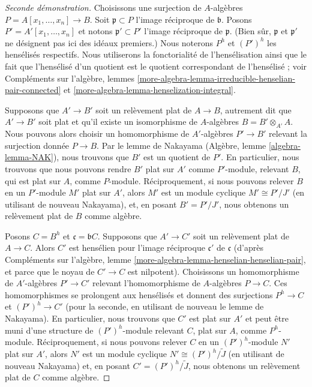 \begin{proof}[Seconde démonstration]
Choisissons une surjection de $A$-algèbres $P = A[x_1, \ldots, x_n] \to B$.
Soit $\mathfrak p \subset P$ l'image réciproque de $\mathfrak b$.
Posons $P' = A'[x_1, \ldots, x_n]$ et notons $\mathfrak p' \subset P'$
l'image réciproque de $\mathfrak p$. (Bien sûr, $\mathfrak p$
et $\mathfrak p'$ ne désignent pas ici des idéaux premiers.)
Nous noterons $P^h$ et $(P')^h$ les hensélisés respectifs.
Nous utiliserons la fonctorialité de l'hensélisation ainsi que le fait que
l'hensélisé d'un quotient est le quotient correspondant
de l'hensélisé ; voir
Compléments sur l'algèbre, lemmes
\ref{more-algebra-lemma-irreducible-henselian-pair-connected} et
\ref{more-algebra-lemma-henselization-integral}.

\medskip\noindent
Supposons que $A' \to B'$ soit un relèvement plat de $A \to B$, autrement dit
que $A' \to B'$ soit plat et qu'il existe un isomorphisme de $A$-algèbres
$B = B' \otimes_{A'} A$. Nous pouvons alors choisir un homomorphisme de $A'$-algèbres
$P' \to B'$ relevant la surjection donnée $P \to B$.
Par le lemme de Nakayama (Algèbre, lemme \ref{algebra-lemma-NAK}),
nous trouvons que $B'$ est un quotient de $P'$. En particulier, nous trouvons
que nous pouvons rendre $B'$ plat sur $A'$ comme $P'$-module,
relevant $B$, qui est plat sur $A$, comme $P$-module.
Réciproquement, si nous pouvons relever $B$ en un $P'$-module $M'$ plat sur $A'$,
alors $M'$ est un module cyclique $M' \cong P'/J'$ (en utilisant de nouveau Nakayama),
et, en posant $B' = P'/J'$, nous obtenons un relèvement plat de $B$ comme algèbre.

\medskip\noindent
Posons $C = B^h$ et $\mathfrak c = \mathfrak bC$.
Supposons que $A' \to C'$ soit un relèvement plat de $A \to C$.
Alors $C'$ est hensélien pour l'image réciproque
$\mathfrak c'$ de $\mathfrak c$
(d'après Compléments sur l'algèbre, lemme \ref{more-algebra-lemma-henselian-henselian-pair},
et parce que le noyau de $C' \to C$ est nilpotent).
Choisissons un homomorphisme de $A'$-algèbres $P' \to C'$ relevant
l'homomorphisme de $A$-algèbres $P \to C$. Ces homomorphismes se prolongent aux
hensélisés et donnent des surjections $P^h \to C$ et $(P')^h \to C'$
(pour la seconde, en utilisant de nouveau le lemme de Nakayama).
En particulier, nous trouvons que $C'$ est plat sur $A'$ et peut être muni d'une structure de
$(P')^h$-module relevant $C$, plat sur $A$, comme $P^h$-module.
Réciproquement, si nous pouvons relever $C$ en un $(P')^h$-module $N'$ plat sur $A'$,
alors $N'$ est un module cyclique $N' \cong (P')^h/\tilde J$
(en utilisant de nouveau Nakayama) et, en posant $C' = (P')^h/\tilde J$,
nous obtenons un relèvement plat de $C$ comme algèbre.


\end{proof}
